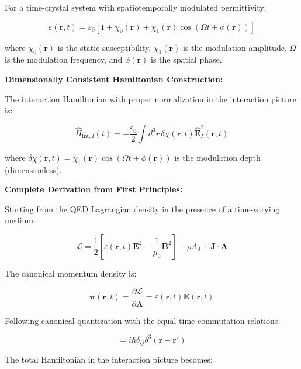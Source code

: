 \documentclass[11pt]{article}
\begin{document}
For a time-crystal system with spatiotemporally modulated permittivity:

\begin{equation}
\varepsilon(\mathbf{r}, t) = \varepsilon_0[1 + \chi_0(\mathbf{r}) + \chi_1(\mathbf{r})\cos(\Omega t + \phi(\mathbf{r}))]
\end{equation}

where $\chi_0(\mathbf{r})$ is the static susceptibility, $\chi_1(\mathbf{r})$ is the modulation amplitude, $\Omega$ is the modulation frequency, and $\phi(\mathbf{r})$ is the spatial phase.

\textbf{Dimensionally Consistent Hamiltonian Construction:}

The interaction Hamiltonian with proper normalization in the interaction picture is:

\begin{equation}
\hat{H}_{\text{int},I}(t) = -\frac{\varepsilon_0}{2} \int d^3r \, \delta\chi(\mathbf{r}, t) \hat{\mathbf{E}}_I^2(\mathbf{r}, t)
\end{equation}

where $\delta\chi(\mathbf{r}, t) = \chi_1(\mathbf{r})\cos(\Omega t + \phi(\mathbf{r}))$ is the modulation depth (dimensionless).

\textbf{Complete Derivation from First Principles:}

Starting from the QED Lagrangian density in the presence of a time-varying medium:

\begin{equation}
\mathcal{L} = \frac{1}{2}\left[\varepsilon(\mathbf{r}, t) \mathbf{E}^2 - \frac{1}{\mu_0} \mathbf{B}^2\right] - \rho A_0 + \mathbf{J} \cdot \mathbf{A}
\end{equation}

The canonical momentum density is:

\begin{equation}
\boldsymbol{\pi}(\mathbf{r}, t) = \frac{\partial \mathcal{L}}{\partial \dot{\mathbf{A}}} = \varepsilon(\mathbf{r}, t) \mathbf{E}(\mathbf{r}, t)
\end{equation}

Following canonical quantization with the equal-time commutation relations:

\begin{equation}
[\hat{A}_{I,i}(\mathbf{r}, t), \hat{\pi}_{I,j}(\mathbf{r}', t)] = i\hbar \delta_{ij} \delta^3(\mathbf{r} - \mathbf{r}')
\end{equation}

The total Hamiltonian in the interaction picture becomes:
\end{document}
